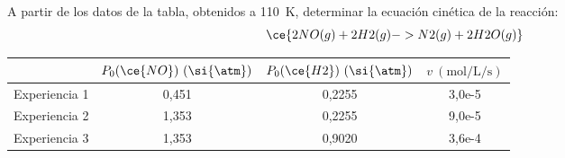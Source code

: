 A partir de los datos de la tabla, obtenidos a \SI{110}{\kelvin}, determinar la ecuación cinética de la reacción:
$$
	\ce{2NO(g) + 2H2(g) -> N2(g) + 2H2O (g)}
$$
\begin{center}
	\begin{tabular}{lSSS}
		\toprule
                		& {$P_0(\ce{NO})~(\si{\atm})$} 	& {$P_0(\ce{H2})~(\si{\atm})$} 	& {$v~(\si{\mol\per\liter\per\second})$} 	\\
		\midrule
		Experiencia 1   & 0,451 			& 0,2255 			& 3,0e-5 				 	\\
		Experiencia 2   & 1,353 			& 0,2255 			& 9,0e-5 					\\
		Experiencia 3   & 1,353 			& 0,9020 			& 3,6e-4 					\\
		\bottomrule
	\end{tabular}
\end{center}
